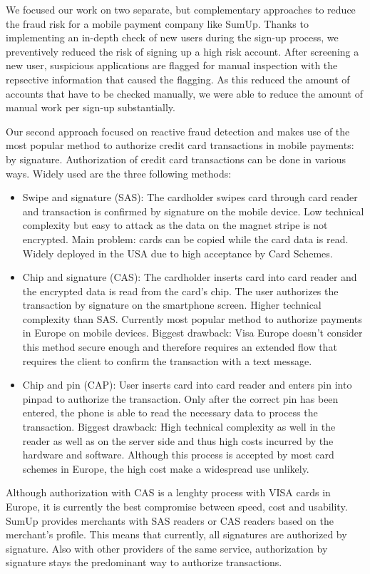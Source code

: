 \documentclass[a4paper, oneside]{csthesis}
\begin{document}
We focused our work on two separate, but complementary approaches to reduce the fraud risk for a mobile payment company like SumUp.
Thanks to implementing an in-depth check of new users during the sign-up process, we preventively reduced the risk of signing up a high risk account. After screening a new user, suspicious applications are flagged for manual inspection with the repsective information that caused the flagging. As this reduced the amount of accounts that have to be checked manually, we were able to reduce the amount of manual work per sign-up substantially.


Our second approach focused on reactive fraud detection and makes use of the most popular method to authorize credit card transactions in mobile payments: by signature.
Authorization of credit card transactions can be done in various ways. Widely used are the three following methods:

\begin{itemize}
\item Swipe and signature (SAS): The cardholder swipes card through card reader and transaction is confirmed by signature on the mobile device. Low technical complexity but easy to attack as the data on the magnet stripe is not encrypted. Main problem: cards can be copied while the card data is read. Widely deployed in the USA due to high acceptance by Card Schemes.
\item Chip and signature (CAS): The cardholder inserts card into card reader and the encrypted data is read from the card's chip. The user authorizes the transaction by signature on the smartphone screen. Higher technical complexity than SAS. Currently most popular method to authorize payments in Europe on mobile devices. Biggest drawback: Visa Europe doesn't consider this method secure enough and therefore requires an extended flow that requires the client to confirm the transaction with a text message.
\item Chip and pin (CAP): User inserts card into card reader and enters pin into pinpad to authorize the transaction. Only after the correct pin has been entered, the phone is able to read the necessary data to process the transaction. Biggest drawback: High technical complexity as well in the reader as well as on the server side and thus high costs incurred by the hardware and software. Although this process is accepted by most card schemes in Europe, the high cost make a widespread use unlikely.
\end{itemize}

Although authorization with CAS is a lenghty process with VISA cards in Europe, it is currently the best compromise between speed, cost and usability. SumUp provides merchants with SAS readers or CAS readers based on the merchant's profile. This means that currently, all signatures are authorized by signature. Also with other providers of the same service, authorization by signature stays the predominant way to authorize transactions.
\end{document}
